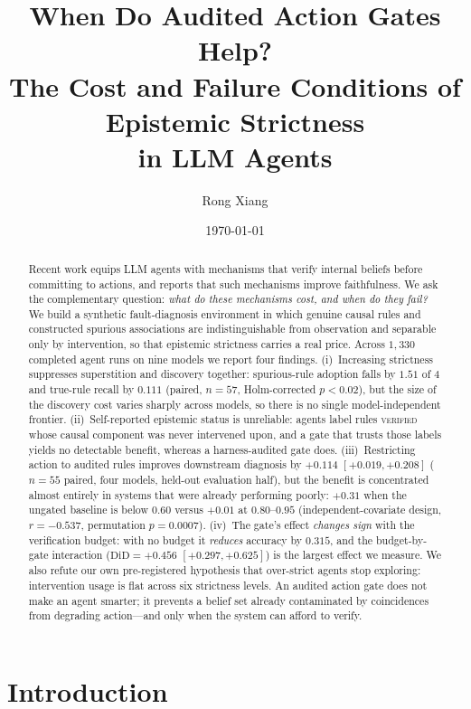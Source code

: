 \documentclass[11pt]{article}
\title{\bfseries When Do Audited Action Gates Help?\\
The Cost and Failure Conditions of Epistemic Strictness\\ in LLM Agents}
\author[1]{Rong Xiang}
\affil[1]{Independent researcher}
\date{\today}
\begin{document}
\maketitle

\begin{abstract}
Recent work equips LLM agents with mechanisms that verify internal beliefs before
committing to actions, and reports that such mechanisms improve faithfulness. We ask
the complementary question: \emph{what do these mechanisms cost, and when do they fail?}
We build a synthetic fault-diagnosis environment in which genuine causal rules and
constructed spurious associations are indistinguishable from observation and separable
only by intervention, so that epistemic strictness carries a real price. Across
$1{,}330$ completed agent runs on nine models we report four findings.
(i)~Increasing strictness suppresses superstition and discovery together: spurious-rule
adoption falls by $1.51$ of $4$ and true-rule recall by $0.111$ (paired, $n{=}57$,
Holm-corrected $p<0.02$), but the size of the discovery cost varies sharply across
models, so there is no single model-independent frontier.
(ii)~Self-reported epistemic status is unreliable: agents label rules \textsc{verified}
whose causal component was never intervened upon, and a gate that trusts those labels
yields no detectable benefit, whereas a harness-audited gate does.
(iii)~Restricting action to audited rules improves downstream diagnosis by
$+0.114$ $[+0.019,+0.208]$ ($n{=}55$ paired, four models, held-out evaluation half),
but the benefit is concentrated almost entirely in systems that were already performing
poorly: $+0.31$ when the ungated baseline is below $0.60$ versus $+0.01$ at
$0.80$--$0.95$ (independent-covariate design, $r{=}-0.537$, permutation $p{=}0.0007$).
(iv)~The gate's effect \emph{changes sign} with the verification budget: with no budget
it \emph{reduces} accuracy by $0.315$, and the budget-by-gate interaction
($\mathrm{DiD}=+0.456$ $[+0.297,+0.625]$) is the largest effect we measure.
We also refute our own pre-registered hypothesis that over-strict agents stop exploring:
intervention usage is flat across six strictness levels. An audited action gate does not
make an agent smarter; it prevents a belief set already contaminated by coincidences from
degrading action---and only when the system can afford to verify.
\end{abstract}

\section{Introduction}
\end{document}
